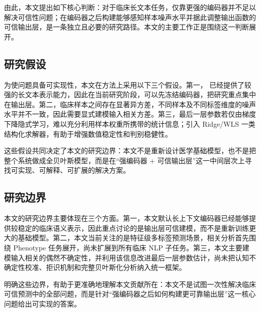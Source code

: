 由此，本文提出如下核心判断：对于临床长文本任务，仅靠更强的编码器并不足以解决可信性问题；在编码器之后构建能够感知样本噪声水平并据此调整输出函数的可信输出层，是一条独立且必要的研究路径。本文的主要工作正是围绕这一判断展开。

\subsection{研究假设}
为使问题具备可实现性，本文在方法上采用以下三个假设。第一，\encoder{} 已经提供了较强的长文本表示能力，因此在当前研究阶段，可以先冻结编码器，把研究重点集中在输出层。第二，临床样本之间存在显著异方差，不同样本及不同标签维度的噪声水平并不一致，因此需要显式建模输入相关方差。第三，最后一层参数若仅由梯度下降隐式学习，难以充分利用样本权重所携带的统计信息；引入 Ridge/WLS 一类结构化求解器，有助于增强数值稳定性和判别稳健性。

这些假设共同决定了本文的研究边界：本文不是重新设计医学基础模型，也不是把整个系统做成全贝叶斯模型，而是在“强编码器 + 可信输出层”这一中间层次上寻找可实现、可解释、可扩展的解决方案。

\subsection{研究边界}
本文的研究边界主要体现在三个方面。第一，本文默认长上下文编码器已经能够提供较稳定的临床语义表示，因此重点讨论的是输出层可信建模，而不是重新训练更大的基础模型。第二，本文当前关注的是特征级多标签预测场景，相关分析首先围绕 Phenotype 任务展开，尚未扩展到所有临床 NLP 子任务。第三，本文主要建模输入相关的偶然不确定性，并利用该信息改进最后一层参数估计，尚未把认知不确定性校准、拒识机制和完整贝叶斯化分析纳入统一框架。

明确这些边界，有助于更准确地理解本文贡献所在：本文不是试图一次性解决临床可信预测中的全部问题，而是针对“强编码器之后如何构建更可靠输出层”这一核心问题给出可实现的答案。

